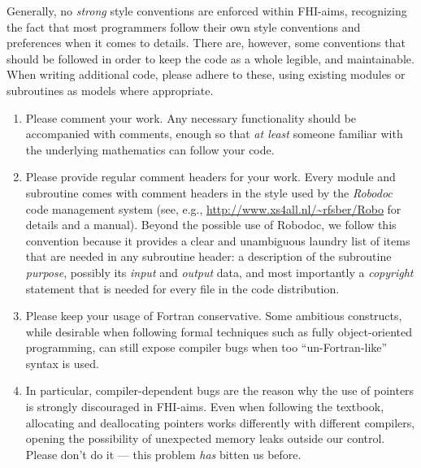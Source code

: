 Generally, no \emph{strong} style conventions are enforced within
FHI-aims, recognizing the fact that most programmers follow their own
style conventions and preferences when it comes to details. There are,
however, some conventions that should be followed in order to keep the
code as a whole legible, and maintainable. When writing additional
code, please adhere to these, using existing modules or subroutines as
models where appropriate.
\begin{enumerate}
  \item Please comment your work. Any necessary functionality should
    be accompanied with comments, enough so that \emph{at least}
    someone familiar with the underlying mathematics can follow your
    code. 
  \item Please provide regular comment headers for your work. Every
    module and subroutine comes with comment headers in the style used
    by the \emph{Robodoc} code management system (see, e.g.,
    \url{http://www.xs4all.nl/~rfsber/Robo} for details and a
    manual). Beyond the possible use of Robodoc, we follow this
    convention because it provides a clear and unambiguous laundry
    list of items that are needed in any subroutine header: a
    description of the subroutine \emph{purpose}, possibly its
    \emph{input} and \emph{output} data, and most importantly a
    \emph{copyright} statement that is needed for every file in the
    code distribution. 
  \item Please keep your usage of Fortran conservative. Some ambitious
    constructs, while desirable when following formal techniques such
    as fully object-oriented programming, can still expose
    compiler bugs when too ``un-Fortran-like'' syntax is used. 
  \item In particular, compiler-dependent bugs are the reason why the
    use of pointers is strongly discouraged in FHI-aims. Even when
    following the textbook, allocating and deallocating pointers works
    differently with different compilers, opening the possibility of
    unexpected memory leaks outside our control. Please don't do it ---
    this problem \emph{has} bitten us before.
\end{enumerate}
